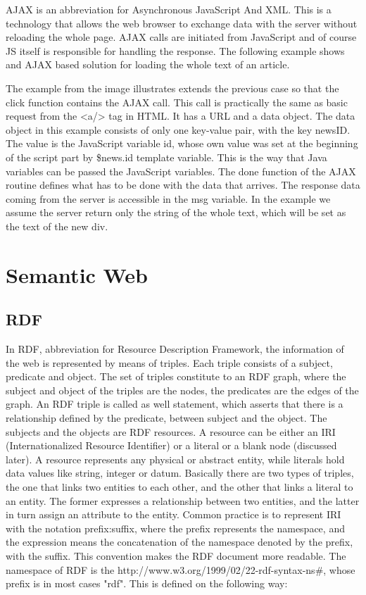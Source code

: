 AJAX is an abbreviation for Asynchronous JavaScript And XML. This is a technology that allows the web browser to exchange data with the server without reloading the whole page. AJAX calls are initiated from JavaScript and of course JS itself is responsible for handling the response. The following example shows and AJAX based solution for loading the whole text of an article.


The example from the image illustrates extends the previous case so that the click function contains the AJAX call. This call is practically the same as basic request from the <a/> tag in HTML. It has a URL and a data object. The data object in this example consists of only one key-value pair, with the key newsID. The value is the JavaScript variable id, whose own value was set at the beginning of the script part by \${news.id} template variable. This is the way that Java variables can be passed the JavaScript variables.  The done function of the AJAX routine defines what has to be done with the data that arrives. The response data coming from the server is accessible in the msg variable. In the example we assume the server return only the string of the whole text, which will be set as the text of the new div.

\section{Semantic Web}

\subsection{RDF}

In RDF, abbreviation for Resource Description Framework, the information of the web is represented by means of triples. Each triple consists of a subject, predicate and object. The set of triples constitute to an RDF graph, where the subject and object of the triples are the nodes, the predicates are the edges of the graph.
An RDF triple is called as well statement, which asserts that there is a relationship defined by the predicate, between subject and the object. The subjects and the objects are RDF resources. A resource can be either an IRI (Internationalized Resource Identifier) or a literal or a blank node (discussed later). A resource represents any physical or abstract entity, while literals hold data values like string, integer or datum. 
Basically there are two types of triples, the one that links two entities to each other, and the other that links a literal to an entity. The former expresses a relationship between two entities, and the latter in turn assign an attribute to the entity.
Common practice is to represent IRI with the notation prefix:suffix, where the prefix represents the namespace, and the expression means the concatenation of the namespace denoted by the prefix, with the suffix. This convention makes the RDF document more readable. The namespace of RDF is the http://www.w3.org/1999/02/22-rdf-syntax-ns\#, whose prefix is in most cases "rdf".   This is defined on the following way:

